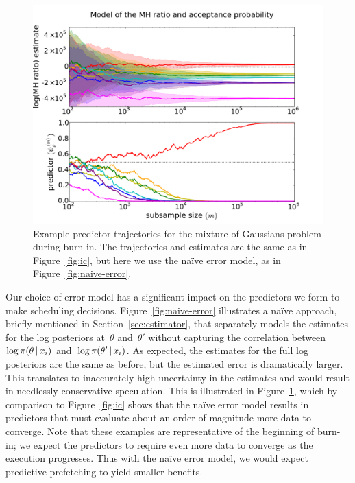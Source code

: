 \documentclass[angelino.tex]{subfiles}
\begin{document}
\begin{figure}[t!]
\begin{center}
\includegraphics[width=\textwidth]{figs/eddie/mix-ic-traces.pdf}
\end{center}
\caption{Example predictor trajectories for the mixture of Gaussians problem
during burn-in.
The trajectories and estimates are the same as in Figure~\ref{fig:ic},
but here we use the na\"ive error model, as in Figure~\ref{fig:naive-error}.
}
\label{fig:naive-predictor}
\end{figure} 

Our choice of error model has a significant impact on the predictors we form
to make scheduling decisions.
Figure~\ref{fig:naive-error} illustrates a na\"ive approach, briefly mentioned in 
Section~\ref{sec:estimator}, that separately models the estimates for the
log posteriors at~$\theta$ and~$\theta'$ without capturing the correlation
between~$\log \pi(\theta \,|\, x_i)$ and~$\log \pi(\theta' \,|\, x_i)$.
As expected, the estimates for the full log posteriors are the same as before,
but the estimated error is dramatically larger.
This translates to inaccurately high uncertainty in the estimates
and would result in needlessly conservative speculation.
This is illustrated in Figure~\ref{fig:naive-predictor}, which by comparison to
Figure~\ref{fig:ic} shows that the na\"ive error model results in predictors
that must evaluate about an order of magnitude more data to converge.
Note that these examples are representative of the beginning of burn-in;
we expect the predictors to require even more data to converge as the
execution progresses.
Thus with the na\"ive error model, we would expect predictive prefetching to
yield smaller benefits.
\end{document}
